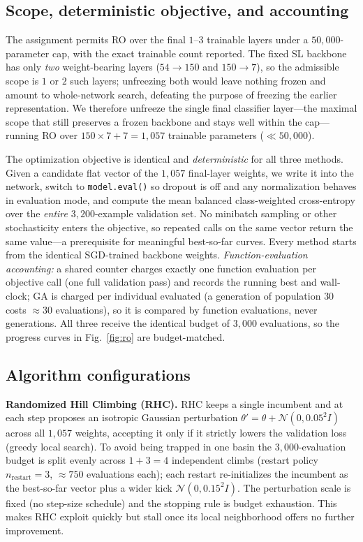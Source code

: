 \documentclass[letterpaper, 10pt, conference]{ieeeconf}
\begin{document}
\subsection{Scope, deterministic objective, and accounting}
The assignment permits RO over the final $1$--$3$ trainable layers under a
$50{,}000$-parameter cap, with the exact trainable count reported. The fixed SL
backbone has only \emph{two} weight-bearing layers ($54{\to}150$ and
$150{\to}7$), so the admissible scope is $1$ or $2$ such layers; unfreezing both
would leave nothing frozen and amount to whole-network search, defeating the
purpose of freezing the earlier representation. We therefore unfreeze the single
final classifier layer---the maximal scope that still preserves a frozen backbone
and stays well within the cap---running RO over $150{\times}7+7 = 1{,}057$
trainable parameters ($\ll 50{,}000$).

The optimization objective is identical and \emph{deterministic} for all three
methods. Given a candidate flat vector of the $1{,}057$ final-layer weights, we
write it into the network, switch to \texttt{model.eval()} so dropout is off and
any normalization behaves in evaluation mode, and compute the mean balanced
class-weighted cross-entropy over the \emph{entire} $3{,}200$-example validation
set. No minibatch sampling or other stochasticity enters the objective, so
repeated calls on the same vector return the same value---a prerequisite for
meaningful best-so-far curves. Every method starts from the identical
SGD-trained backbone weights. \emph{Function-evaluation accounting:} a shared
counter charges exactly one function evaluation per objective call (one full
validation pass) and records the running best and wall-clock; GA is charged per
individual evaluated (a generation of population $30$ costs $\approx\!30$
evaluations), so it is compared by function evaluations, never generations. All
three receive the identical budget of $3{,}000$ evaluations, so the progress
curves in Fig.~\ref{fig:ro} are budget-matched.

\subsection{Algorithm configurations}
\textbf{Randomized Hill Climbing (RHC).} RHC keeps a single incumbent and at each
step proposes an isotropic Gaussian perturbation $\theta'=\theta+\mathcal{N}(0,0.05^2 I)$
across all $1{,}057$ weights, accepting it only if it strictly lowers the
validation loss (greedy local search). To avoid being trapped in one basin the
$3{,}000$-evaluation budget is split evenly across $1{+}3{=}4$ independent climbs
(restart policy $n_{\text{restart}}{=}3$, $\approx\!750$ evaluations each); each
restart re-initializes the incumbent as the best-so-far vector plus a wider kick
$\mathcal{N}(0,0.15^2 I)$. The perturbation scale is fixed (no step-size
schedule) and the stopping rule is budget exhaustion. This makes RHC exploit
quickly but stall once its local neighborhood offers no further improvement.
\end{document}
